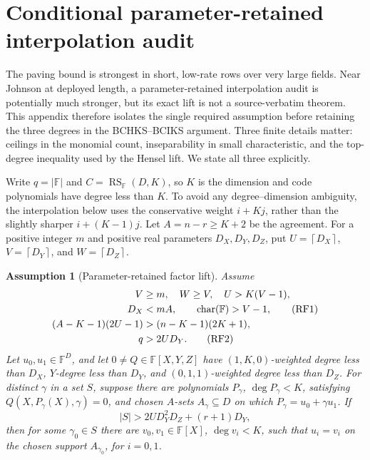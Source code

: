 \documentclass[11pt,a4paper]{amsart}
\numberwithin{equation}{section}
\newtheorem{assumption}[assumption]{Assumption}
\theoremstyle{remark}
\DeclareMathOperator{\RS}{RS}
\newcommand{\F}{\mathbb F}
\newcommand{\abs}[1]{\lvert #1\rvert}
\newcommand{\ceil}[1]{\left\lceil #1\right\rceil}
\begin{document}
\appendix
\section{Conditional parameter-retained interpolation audit}
\label{app:retained-interpolation}

The paving bound is strongest in short, low-rate rows over very large
fields.  Near Johnson at deployed length, a parameter-retained
interpolation audit is potentially much stronger, but its exact lift is
not a source-verbatim theorem.  This appendix therefore isolates the
single required assumption before retaining the three degrees in the
BCHKS--BCIKS argument.  Three finite details
matter: ceilings in the monomial count, inseparability in small
characteristic, and the top-degree inequality used by the Hensel lift.
We state all three explicitly.

Write \(q=\abs\F\) and \(C=\RS_\F(D,K)\), so \(K\) is the dimension and code
polynomials have degree less than \(K\).  To avoid any degree--dimension
ambiguity, the interpolation below uses the conservative weight
\(i+Kj\), rather than the slightly sharper \(i+(K-1)j\).  Let
\(A=n-r\ge K+2\) be the agreement.  For a positive integer \(m\) and
positive real parameters \(D_X,D_Y,D_Z\), put
\(U=\ceil{D_X}\), \(V=\ceil{D_Y}\), and \(W=\ceil{D_Z}\).

\begin{assumption}[Parameter-retained factor lift]
\label{ass:retained-factor-lift}
Assume
\begin{align}
 V&\ge m,\quad W\ge V,\quad U>K(V-1),\notag\\
 D_X&<mA,\qquad \operatorname{char}(\F)>V-1,          \tag{RF1}\\
 (A-K-1)(2U-1)&>(n-K-1)(2K+1),\notag\\
 q&>2UD_Y.                                           \tag{RF2}
\end{align}
Let \(u_0,u_1\in\F^D\), and let \(0\ne Q\in\F[X,Y,Z]\) have
\((1,K,0)\)-weighted degree less than \(D_X\), \(Y\)-degree less
than \(D_Y\), and \((0,1,1)\)-weighted degree less than \(D_Z\).
For distinct \(\gamma\) in a set \(S\), suppose there are polynomials
\(P_\gamma\), \(\deg P_\gamma<K\), satisfying
\(Q(X,P_\gamma(X),\gamma)=0\), and chosen \(A\)-sets
\(A_\gamma\subseteq D\) on which
\(P_\gamma=u_0+\gamma u_1\).  If
\[
 \abs S>2U D_Y^2D_Z+(r+1)D_Y,                     \tag{RF3}
 \label{eq:retained-factor-threshold}
\]
then for some \(\gamma_0\in S\) there are
\(v_0,v_1\in\F[X]\), \(\deg v_i<K\), such that
\(u_i=v_i\) on the chosen support \(A_{\gamma_0}\), for
\(i=0,1\).
\end{assumption}
\end{document}
